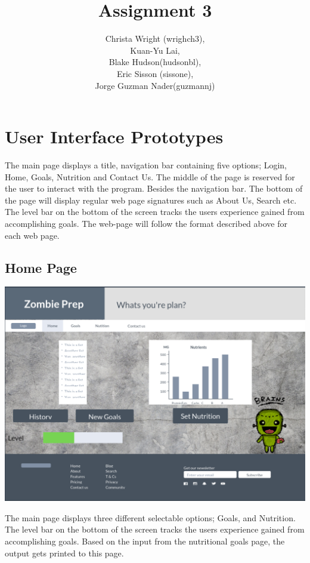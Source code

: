 \documentclass[a4paper]{article}
\title{Assignment 3}
\author{Christa Wright (wrighch3),\\ Kuan-Yu Lai,\\ Blake Hudson(hudsonbl), \\Eric Sisson (sissone), \\ Jorge Guzman Nader(guzmannj)}
\begin{document}
\maketitle
\tableofcontents
\pagebreak
\section{User Interface Prototypes}
The main page displays a title, navigation bar containing five options; Login, Home, Goals, Nutrition and Contact Us. The middle of the page is reserved for the user to interact with the program. Besides the navigation bar. The bottom of the page will display regular web page signatures such as About Us, Search etc. The level bar on the bottom of the screen tracks the users experience gained from accomplishing goals. The web-page will follow the format described above for each web page.

\subsection{Home Page}
\includegraphics[width=\textwidth]{HomePage.PNG}

The main page displays three different selectable options; Goals, and Nutrition. The level bar on the bottom of the screen tracks the users experience gained from accomplishing goals. Based on the input from the nutritional goals page, the output gets printed to this page.
\end{document}
